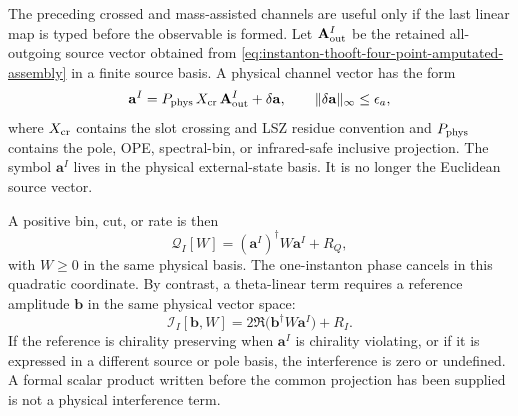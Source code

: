 \begin{remark}
\label{rem:instanton-same-coordinate-amplitude-rate-obligation}
The preceding crossed and mass-assisted channels are useful only if the last
linear map is typed before the observable is formed.  Let
\(\mathbf A_{\rm out}^{I}\) be the retained all-outgoing source vector obtained
from \eqref{eq:instanton-thooft-four-point-amputated-assembly} in a finite
source basis.  A physical channel vector has the form
\begin{equation}
  \mathbf a^{I}
  =
  P_{\rm phys}\,X_{\rm cr}\,\mathbf A_{\rm out}^{I}
  +\delta\mathbf a,
  \qquad
  \|\delta\mathbf a\|_{\infty}\le\epsilon_a ,
  \label{eq:instanton-same-coordinate-physical-vector}
\end{equation}
where \(X_{\rm cr}\) contains the slot crossing and LSZ residue convention and
\(P_{\rm phys}\) contains the pole, OPE, spectral-bin, or infrared-safe
inclusive projection.  The symbol \(\mathbf a^I\) lives in the physical
external-state basis.  It is no longer the Euclidean source vector.

A positive bin, cut, or rate is then
\begin{equation}
  \mathcal Q_I[W]
  =
  (\mathbf a^{I})^\dagger W\mathbf a^{I}
  +R_Q,
  \label{eq:instanton-same-coordinate-positive-rate}
\end{equation}
with \(W\ge0\) in the same physical basis.  The one-instanton phase cancels in
this quadratic coordinate.  By contrast, a theta-linear term requires a
reference amplitude \(\mathbf b\) in the same physical vector space:
\begin{equation}
  \mathcal I_I[\mathbf b,W]
  =
  2\Re\bigl(\mathbf b^\dagger W\mathbf a^{I}\bigr)
  +R_I .
  \label{eq:instanton-same-coordinate-interference}
\end{equation}
If the reference is chirality preserving when \(\mathbf a^I\) is chirality
violating, or if it is expressed in a different source or pole basis, the
interference is zero or undefined.  A formal scalar product written before the
common projection has been supplied is not a physical interference term.


\end{remark}
